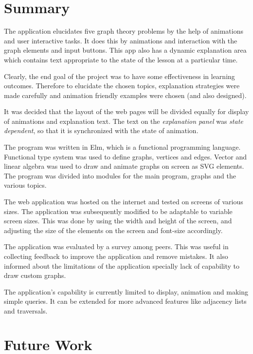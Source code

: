 \section{Summary}

The application elucidates five graph theory problems by the help of animations
and user interactive tasks. It does this by animations and interaction with the
graph elements and input buttons. This app also has a dynamic explanation area
which contains text appropriate to the state of the lesson at a particular
time.

Clearly, the end goal of the project was to have some effectiveness in learning
outcomes. Therefore to elucidate the chosen topics, explanation strategies
were made carefully and animation friendly examples were chosen (and also designed). 

It was decided that the layout of the web pages will be divided equally for
display of animations and explanation text. The text on the \emph{explanation
panel} was \emph{state dependent}, so that it is synchronized with the state of
animation.

The program was written in Elm, which is a functional programming language.
Functional type system was used to define graphs, vertices and edges.  Vector
and linear algebra was used to draw and animate graphs on screen as SVG
elements. The program was divided into modules for the main program, graphs and
the various topics.

The web application was hosted on the internet and tested on screens of various
sizes. The application was subsequently modified to be adaptable to variable
screen sizes. This was done by using the width and height of the screen, and
adjusting the size of the elements on the screen and font-size accordingly. 

The application was evaluated by a survey among peers. This was useful in
collecting feedback to improve the application and remove mistakes. It also
informed about the limitations of the application specially lack of capability
to draw custom graphs.

The application's capability is currently limited to display, animation and
making simple queries. It can be extended for more advanced features like
adjacency lists and traversals. 


\section{Future Work}

